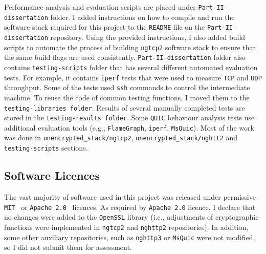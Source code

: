 \documentclass[12pt,a4paper]{report}
\newcommand\note[2]{{\color{#1}\bf #2}}
\newcommand\simon[1]{\ifcomments{\note{cyan}{SM: #1}}\fi}
\begin{document}
Performance analysis and evaluation scripts are placed under \texttt{Part-II-dissertation} folder.
I added instructions on how to compile and run the software stack required for this project to the \texttt{README} file on the \texttt{Part-II-dissertation} repository.
Using the provided instructions, I also added build scripts to automate the process of building \texttt{ngtcp2} software stack to ensure that the same build flags are used consistently.
\texttt{Part-II-dissertation} folder also contains \texttt{testing-scripts} folder that has several different automated evaluation tests.
For example, it contains \texttt{iperf} tests that were used to measure \texttt{TCP} and \texttt{UDP} throughput.
Some of the tests used \texttt{ssh} commands to control the intermediate machine.
To reuse the code of common testing functions, I moved them to the \texttt{testing-libraries folder}.
Results of several manually completed tests are stored in the \texttt{testing-results folder}.
Some \texttt{QUIC} behaviour analysis tests use additional evaluation tools (e.g., \texttt{FlameGraph}, \texttt{iperf}, \texttt{MsQuic}).
Most of the work was done in \texttt{unencrypted\_stack/ngtcp2}, \texttt{unencrypted\_stack/nghtt2} and \texttt{testing-scripts} sections.






\subsection{Software Licences} 

The vast majority of software used in this project was released under permissive \texttt{MIT}~\cite{nghttp3-MIT-License, ngtcp2-MIT-License, msquic-MIT-License} or \texttt{Apache 2.0}~\cite{openssl-license} licences.
As required by \texttt{Apache 2.0} licence, I declare that no changes were added to the \texttt{OpenSSL} library (i.e., adjustments of cryptographic functions were implemented in \texttt{ngtcp2} and \texttt{nghttp2} repositories).
In addition, some other auxiliary repositories, such as \texttt{nghttp3} or \texttt{MsQuic} were not modified, so I did not submit them for assessment.



\end{document}
